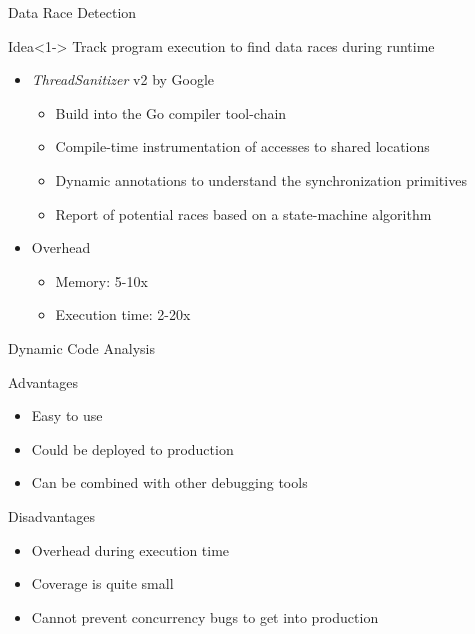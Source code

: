 \documentclass[english,aspectratio=43,t]{beamer}
\begin{document}
\begin{frame}{Data Race Detection}
    \begin{block}{Idea}<1->
        Track program execution to find data races during runtime
    \end{block}
    \begin{itemize}
        \item<2-> \emph{ThreadSanitizer} v2 by Google~\cite{threadSanitizer}
        \begin{itemize}
            \item Build into the Go compiler tool-chain
            \item Compile-time instrumentation of accesses to shared locations
            \item Dynamic annotations to understand the synchronization primitives
            \item Report of potential races based on a state-machine algorithm
        \end{itemize}
        \item<3-> Overhead
        \begin{itemize}
            \item Memory: 5-10x
            \item Execution time: 2-20x
        \end{itemize}
    \end{itemize}
\end{frame}

\begin{frame}[c]{Dynamic Code Analysis}
    \centering
    \begin{exampleblock}{Advantages}
        \begin{itemize}
            \item Easy to use
            \item Could be deployed to production
            \item Can be combined with other debugging tools
        \end{itemize}
    \end{exampleblock}
    \begin{alertblock}{Disadvantages}
        \begin{itemize}
            \item Overhead during execution time
            \item Coverage is quite small
            \item Cannot prevent concurrency bugs to get into production
        \end{itemize}
    \end{alertblock}
\end{frame}
\end{document}

